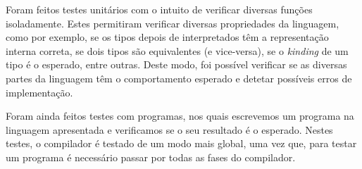 Foram feitos testes unitários com o intuito de verificar diversas funções isoladamente. Estes permitiram verificar diversas propriedades da linguagem, como por exemplo, se os tipos depois de interpretados têm a representação interna correta, se dois tipos são equivalentes (e vice-versa), se o \textit{kinding} de um tipo é o esperado, entre outras. Deste modo, foi possível verificar se as diversas partes da linguagem têm o comportamento esperado e detetar possíveis erros de implementação.

Foram ainda feitos testes com programas, nos quais escrevemos um programa na linguagem apresentada e verificamos se o seu resultado é o esperado. Nestes testes, o compilador é testado de um modo mais global, uma vez que, para testar um programa é necessário passar por todas as fases do compilador.




